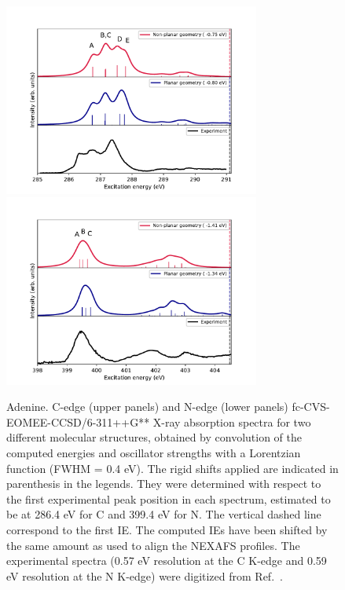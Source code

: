 \documentclass[journal=jctcce,manuscript=article]{achemso}
\begin{document}
\begin{figure}[H]
\includegraphics[width=0.75\textwidth]{Spectra/Adenine_C.pdf}
\includegraphics[width=0.75\textwidth]{Spectra/Adenine_N.pdf}
\caption{Adenine. C-edge (upper panels) and N-edge (lower panels) 
fc-CVS-EOMEE-CCSD/6-311++G** X-ray absorption spectra for two different molecular structures, obtained by convolution of the computed energies and oscillator strengths with a Lorentzian function (FWHM = 0.4 eV). The rigid shifts applied are indicated in parenthesis in the legends. They were determined with respect to the first experimental peak position in each spectrum, estimated to be at 286.4 eV for C and 399.4 eV for N.
The vertical dashed line correspond to the first IE. 
The computed IEs have been shifted by the same amount as used to align the NEXAFS profiles.
The experimental spectra (0.57 eV resolution at the C K-edge and 0.59 eV resolution at the N K-edge) were digitized from Ref.~.
\label{fgr:Adenine}}
\end{figure}
\end{document}
